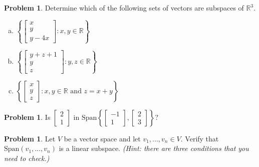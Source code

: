 \documentclass[10pt]{article}
\theoremstyle{definition}
\newtheorem{problem}[theorem]{Problem}
\newcommand{\1}[1]{\textbf{1}_{\left[#1\right]}} %
\def\R{\mathbb{R}} %
\begin{document}
\begin{problem}
  Determine which of the following sets of vectors are subspaces of $\R^{3}$.
  \begin{enumerate}[(a)]
    \item $\left\{
      \begin{bmatrix}
        x\\y\\y-4x
      \end{bmatrix}: x,y\in \R
    \right\} $
    \item  $\left\{
      \begin{bmatrix}
        y+z+1\\y\\z
      \end{bmatrix}: y,z\in \R
    \right\} $
    \item  $\left\{
      \begin{bmatrix}
        x\\y\\z
      \end{bmatrix}: x,y\in \R \text{ and }z=x+y
    \right\} $
  \end{enumerate}
\end{problem}

\begin{problem}
  Is $
  \begin{bmatrix}
    2\\1
  \end{bmatrix}
  $
  in
  $\mathrm{Span} \left\{
    \begin{bmatrix}
      -1\\1
    \end{bmatrix}
    ,
    \begin{bmatrix}
      2\\3
    \end{bmatrix}
  \right\}? $
\end{problem}


\begin{problem}
  Let $V$ be a vector space and let $v_{1},\ldots,v_{n}\in V$. Verify that
  $\text{Span}(v_{1},\ldots,v_{n})$ is a linear subspace. \textit{(Hint: there
    are three conditions that you need to check.)}
\end{problem}
\end{document}
